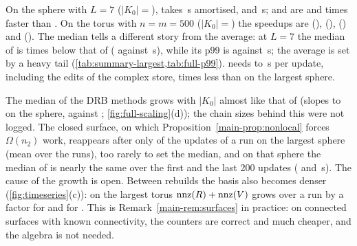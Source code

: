 On the sphere with $L=7$ ($|K_0|={}$\NumWOneSphereLSevenSize), 
takes \NumWOneSphereLSevenFullIdAmort\,\textmu s amortised, 
\NumWOneSphereLSevenDrbIdAmort{} and 
\NumWOneSphereLSevenDrbIdRbAmort\,\textmu s;  and
 are \NumWOneSphereLSevenMmhmNorbSpeedupFullId{} and
\NumWOneSphereLSevenMmhmSpeedupFullId{} times faster than . On
the torus with $n=m=500$ ($|K_0|={}$\NumWOneTorusFiveHundredSize) the speedups
are \NumWOneTorusFiveHundredDrbIdSpeedupFullId{} (),
\NumWOneTorusFiveHundredDrbIdRbSpeedupFullId{} (),
\NumWOneTorusFiveHundredMmhmSpeedupFullId{} () and
\NumWOneTorusFiveHundredMmhmNorbSpeedupFullId{} (). The median
tells a different story from the average: at $L=7$ the median of 
is \NumWOneSphereLSevenMmhmSpeedupFullIdMed{} times below that of
 (\NumWOneSphereLSevenMmhmMed{} against
\NumWOneSphereLSevenFullIdMed\,\textmu s), while its p99 is
\NumWOneSphereLSevenMmhmPNinetyNine{} against
\NumWOneSphereLSevenFullIdPNinetyNine\,\textmu s; the average is set by a heavy
tail (\cref{tab:summary-largest,tab:full-p99}).  needs
\NumWOneSphereLFourEulerAmort{} to \NumWOneTorusFiveHundredEulerAmort\,\textmu s
per update, including the edits of the complex store,
\NumWOneSphereLSevenEulerSpeedupFullId{} times less than  on the
largest sphere.

The median of the DRB methods grows with $|K_0|$ almost like that of
 (slopes \NumSlopeEFiveWOneSphereMmhmNorbMed{} to
\NumSlopeEFiveWOneSphereDrbIdRbMed{} on the sphere, against
\NumSlopeEFiveWOneSphereFullIdMed; \cref{fig:full-scaling}(d)); the chain sizes
behind this were not logged. The closed surface,
on which Proposition~\ref{main-prop:nonlocal} forces $\Omega(n_2)$ work, reappears after only
\NumWOneSphereLSevenClosedStates{} of the \NumUpdates{} updates of a run on the
largest sphere (mean over the runs), too rarely to set the median, and on that
sphere the median of  is nearly the same over the first and the
last 200 updates (\NumWOneSphereLSevenMmhmNorbFirstBlockMed{} and
\NumWOneSphereLSevenMmhmNorbLastBlockMed\,\textmu s). The cause of the growth is open. Between rebuilds the basis also becomes denser
(\cref{fig:timeseries}(c)): on the largest torus $\operatorname{nnz}(R)+\operatorname{nnz}(V)$ grows over a
run by a factor \NumWOneTorusFiveHundredDrbIdNnzGrowth{} for  and
\NumWOneTorusFiveHundredMmhmNorbNnzGrowth{} for . This is
Remark~\ref{main-rem:surfaces} in practice: on connected surfaces with known connectivity,
the counters are correct and much cheaper, and the algebra is not needed.


